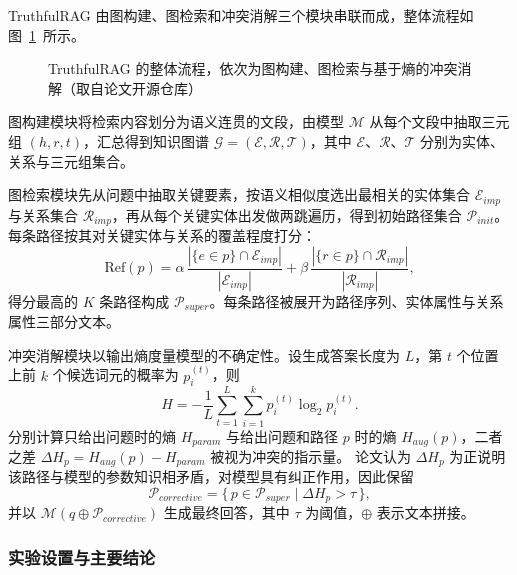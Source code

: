 TruthfulRAG 由图构建、图检索和冲突消解三个模块串联而成，整体流程如图~\ref{fig:cl-pipeline}~所示。

\begin{figure}[tbp]
  \centering
  \caption{TruthfulRAG 的整体流程，依次为图构建、图检索与基于熵的冲突消解（取自论文开源仓库）}
  \label{fig:cl-pipeline}
\end{figure}

图构建模块将检索内容划分为语义连贯的文段，由模型 $\mathcal{M}$ 从每个文段中抽取三元组 $(h,r,t)$，汇总得到知识图谱 $\mathcal{G}=(\mathcal{E},\mathcal{R},\mathcal{T})$，其中 $\mathcal{E}$、$\mathcal{R}$、$\mathcal{T}$ 分别为实体、关系与三元组集合。

图检索模块先从问题中抽取关键要素，按语义相似度选出最相关的实体集合 $\mathcal{E}_{imp}$ 与关系集合 $\mathcal{R}_{imp}$，再从每个关键实体出发做两跳遍历，得到初始路径集合 $\mathcal{P}_{init}$。
每条路径按其对关键实体与关系的覆盖程度打分：
\begin{equation}
  \mathrm{Ref}(p)=\alpha\,\frac{|\{e\in p\}\cap\mathcal{E}_{imp}|}{|\mathcal{E}_{imp}|}
               +\beta\,\frac{|\{r\in p\}\cap\mathcal{R}_{imp}|}{|\mathcal{R}_{imp}|},
  \label{eq:cl-ref}
\end{equation}
得分最高的 $K$ 条路径构成 $\mathcal{P}_{super}$。每条路径被展开为路径序列、实体属性与关系属性三部分文本。

冲突消解模块以输出熵度量模型的不确定性。设生成答案长度为 $L$，第 $t$ 个位置上前 $k$ 个候选词元的概率为 $p_i^{(t)}$，则
\begin{equation}
  H = -\frac{1}{L}\sum_{t=1}^{L}\sum_{i=1}^{k} p_i^{(t)}\log_2 p_i^{(t)} .
  \label{eq:cl-entropy}
\end{equation}
分别计算只给出问题时的熵 $H_{param}$ 与给出问题和路径 $p$ 时的熵 $H_{aug}(p)$，二者之差 $\Delta H_p=H_{aug}(p)-H_{param}$ 被视为冲突的指示量。
论文认为 $\Delta H_p$ 为正说明该路径与模型的参数知识相矛盾，对模型具有纠正作用，因此保留
\begin{equation}
  \mathcal{P}_{corrective}=\{\,p\in\mathcal{P}_{super}\mid \Delta H_p>\tau\,\},
  \label{eq:cl-paperrule}
\end{equation}
并以 $\mathcal{M}(q\oplus\mathcal{P}_{corrective})$ 生成最终回答，其中 $\tau$ 为阈值，$\oplus$ 表示文本拼接。

\subsubsection{实验设置与主要结论}

